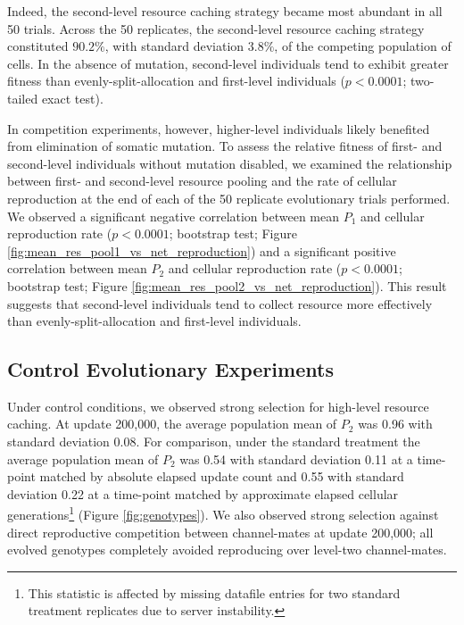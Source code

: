 Indeed, the second-level resource caching strategy became most abundant in all 50 trials.
Across the 50 replicates, the second-level resource caching strategy constituted $90.2 \%$, with standard deviation $3.8 \%$, of the competing population of cells.
In the absence of mutation, second-level individuals tend to exhibit greater fitness than evenly-split-allocation and first-level individuals ($p < 0.0001$; two-tailed exact test).




In competition experiments, however, higher-level individuals likely benefited from elimination of somatic mutation.
To assess the relative fitness of first- and second-level individuals without mutation disabled, we examined the relationship between first- and second-level resource pooling and the rate of cellular reproduction at the end of each of the 50 replicate evolutionary trials performed.
We observed a significant negative correlation between mean $P_1$ and cellular reproduction rate ($p < 0.0001$; bootstrap test; Figure \ref{fig:mean_res_pool1_vs_net_reproduction}) and a significant positive correlation between mean $P_2$ and cellular reproduction rate ($p < 0.0001$; bootstrap test; Figure \ref{fig:mean_res_pool2_vs_net_reproduction}).
This result suggests that second-level individuals tend to collect resource more effectively than evenly-split-allocation and first-level individuals.

\subsection{Control Evolutionary Experiments}



Under control conditions, we observed strong selection for high-level resource caching.
At update 200,000, the average population mean of $P_2$ was 0.96 with standard deviation 0.08.
For comparison, under the standard treatment the average population mean of $P_2$ was 0.54 with standard deviation 0.11 at a time-point matched by absolute elapsed update count and 0.55 with standard deviation 0.22 at a time-point matched by approximate elapsed cellular generations\footnote{This statistic is affected by missing datafile entries for two standard treatment replicates due to server instability.} (Figure \ref{fig:genotypes}).
We also observed strong selection against direct reproductive competition between channel-mates at update 200,000; all evolved genotypes completely avoided reproducing over level-two channel-mates.

